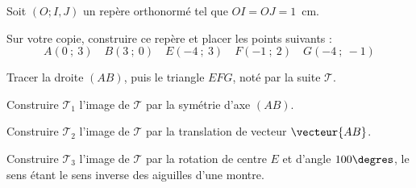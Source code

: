 Soit $(O ;  I , J)$ un repère orthonormé tel que $OI = OJ = 1$~cm.
\begin{myenumerate}
\item Sur votre copie, construire ce repère et placer les points suivants :
	\[A(0~;~3)\quad B(3~;~0)\quad E(-4~;~3)\quad F(-1~;~2)\quad G(- 4~; ~-1)\]
\item Tracer la droite $(AB)$, puis le triangle $EFG$, noté par la suite $\mathscr T$.
\item Construire $\mathscr T_{1}$ l'image de $\mathscr T$ par la symétrie d'axe $(AB)$.
\item Construire $\mathscr T_{2}$ l'image de $\mathscr T$ par la translation de vecteur $\vecteur{AB}$.
\item Construire $\mathscr T_{3}$ l'image de $\mathscr T$ par la rotation de centre $E$ et d'angle $100\degres$, le sens étant le sens inverse des aiguilles d'une montre.
\end{myenumerate}